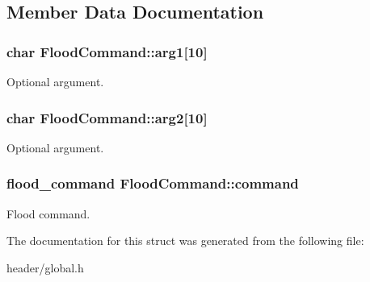 \subsection{Member Data Documentation}
\hypertarget{structFloodCommand_abfd3e6c3afbc29a96e44d48113e470cb}{
\subsubsection[{arg1}]{\setlength{\rightskip}{0pt plus 5cm}char Flood\-Command\-::arg1\mbox{[}10\mbox{]}}}\label{structFloodCommand_abfd3e6c3afbc29a96e44d48113e470cb}
Optional argument. \hypertarget{structFloodCommand_a5b67492eac0bf5d5f2a485c249520ecb}{
\subsubsection[{arg2}]{\setlength{\rightskip}{0pt plus 5cm}char Flood\-Command\-::arg2\mbox{[}10\mbox{]}}}\label{structFloodCommand_a5b67492eac0bf5d5f2a485c249520ecb}
Optional argument. \hypertarget{structFloodCommand_a44fa66244aee8f4128e1eba268bd8482}{
\subsubsection[{command}]{\setlength{\rightskip}{0pt plus 5cm}flood\-\_\-command Flood\-Command\-::command}}\label{structFloodCommand_a44fa66244aee8f4128e1eba268bd8482}
Flood command. 

The documentation for this struct was generated from the following file\-:\begin{DoxyCompactItemize}
\item 
header/global.\-h\end{DoxyCompactItemize}
